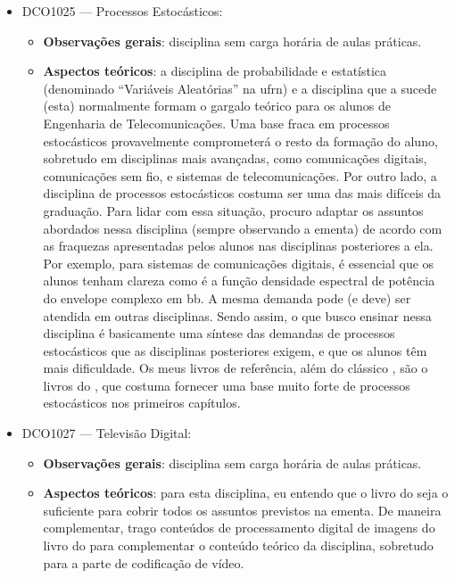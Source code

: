 \documentclass{article}
\begin{document}
\begin{itemize}
\begin{itemize}
        \item \textbf{Ferramentas}: apesar de ser possível utilizar MATLAB/Simulink para simular canais móveis com desvanecimento, busco priorizar a teoria nesta disciplina e trabalhar com simulação apenas a nível de pós-graduação e pesquisa.
    \end{itemize}
    \item DCO1025 --- Processos Estocásticos:
    \begin{itemize}
        \item \textbf{Observações gerais}: disciplina sem carga horária de aulas práticas.
        \item \textbf{Aspectos teóricos}: a disciplina de probabilidade e estatística (denominado ``Variáveis Aleatórias'' na \gls{ufrn}) e a disciplina que a sucede (esta) normalmente formam o gargalo teórico para os alunos de Engenharia de Telecomunicações. Uma base fraca em processos estocásticos provavelmente comprometerá o resto da formação do aluno, sobretudo em disciplinas mais avançadas, como comunicações digitais, comunicações sem fio, e sistemas de telecomunicações. Por outro lado, a disciplina de processos estocásticos costuma ser uma das mais difíceis da graduação. Para lidar com essa situação, procuro adaptar os assuntos abordados nessa disciplina (sempre observando a ementa) de acordo com as fraquezas apresentadas pelos alunos nas disciplinas posteriores a ela. Por exemplo, para sistemas de comunicações digitais, é essencial que os alunos tenham clareza como é a função densidade espectral de potência do envelope complexo em \gls{bb}. A mesma demanda pode (e deve) ser atendida em outras disciplinas. Sendo assim, o que busco ensinar nessa disciplina é basicamente uma síntese das demandas de processos estocásticos que as disciplinas posteriores exigem, e que os alunos têm mais dificuldade. Os meus livros de referência, além do clássico \textcite{papoulisProbabilityRandomVariables2001}, são o livros do \textcite{meyrDigitalCommunicationReceivers1998}, que costuma fornecer uma base muito forte de processos estocásticos nos primeiros capítulos.
    \end{itemize}
    \item DCO1027 --- Televisão Digital:
    \begin{itemize}
        \item \textbf{Observações gerais}: disciplina sem carga horária de aulas práticas.
        \item \textbf{Aspectos teóricos}: para esta disciplina, eu entendo que o livro do \textcite{alencarTelevisaoDigital2010} seja o suficiente para cobrir todos os assuntos previstos na ementa. De maneira complementar, trago conteúdos de processamento digital de imagens do livro do \textcite{gonzalezDigitalImageProcessing2018} para complementar o conteúdo teórico da disciplina, sobretudo para a parte de codificação de vídeo.

\end{itemize}
\end{itemize}
\end{document}
